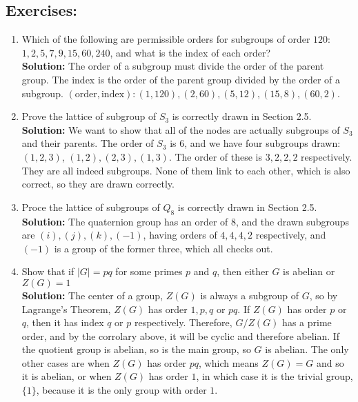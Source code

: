 \documentclass{article}
\begin{document}
\subsection{Exercises:}

\begin{enumerate}
    \item Which of the following are permissible orders for subgroups of order $120$: $1,2,5,7,9,15,60,240$, and what is the index of each order? \\ \textbf{Solution:} The order of a subgroup must divide the order of the parent group. The index is the order of the parent group divided by the order of a subgroup. $(\text{order},\text{index}): (1,120), (2,60), (5,12), (15,8), (60,2)$.
    \item Prove the lattice of subgroup of $S_3$ is correctly drawn in Section 2.5. \\ \textbf{Solution:} We want to show that all of the nodes are actually subgroups of $S_3$ and their parents. The order of $S_3$ is 6, and we have four subgroups drawn: $(1,2,3)$, $(1,2),(2,3),(1,3)$. The order of these is $3,2,2,2$ respectively. They are all indeed subgroups. None of them link to each other, which is also correct, so they are drawn correctly. 
    \item Proce the lattice of subgroups of $Q_8$ is correctly drawn in Section 2.5. \\ \textbf{Solution:} The quaternion group has an order of $8$, and the drawn subgroups are $(i),(j),(k),(-1)$, having orders of $4,4,4,2$ respectively, and $(-1)$ is a group of the former three, which all checks out.
    \item Show that if $\vert G \vert = pq$ for some primes $p$ and $q$, then either $G$ is abelian or $Z(G) = 1$ \\ \textbf{Solution:} The center of a group, $Z(G)$ is always a subgroup of $G$, so by Lagrange's Theorem, $Z(G)$ has order $1,p,q$ or $pq$. If $Z(G)$ has order $p$ or $q$, then it has index $q$ or $p$ respectively. Therefore, $G/Z(G)$ has a prime order, and by the corrolary above, it will be cyclic and therefore abelian. If the quotient group is abelian, so is the main group, so $G$ is abelian. The only other cases are when $Z(G)$ has order $pq$, which means $Z(G) = G$ and so it is abelian, or when $Z(G)$ has order $1$, in which case it is the trivial group, $\{1\}$, because it is the only group with order $1$. 
\end{enumerate}
\end{document}
